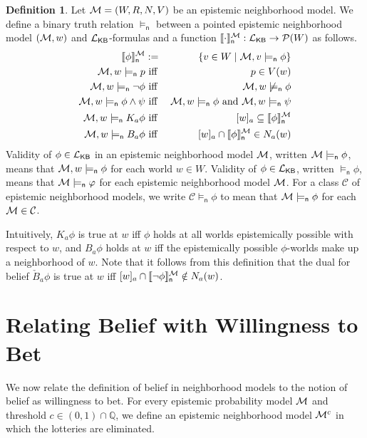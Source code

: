 \documentclass[12pt]{article}
\theoremstyle{definition}
\newtheorem{definition}[theorem]{Definition}
\newcommand{\Rat}{\mathbb{Q}}  %
\newcommand{\pow}{{\cal P}}    %
\newcommand{\M}{{\cal M}}      %
\newcommand{\Lang}{{\cal L}}   %
\newcommand{\KB}{{\mathsf{KB}}}                     %
\newcommand{\modelsn}{\models_{\mathsf{n}}}                  %
\newcommand{\semn}[1]{\llbracket{#1}\rrbracket_{\mathsf{n}}} %
\begin{document}
\begin{definition} 
  Let $\M = (W,R,N,V)$ be an epistemic neighborhood model.  We define
  a binary truth relation $\modelsn$ between a pointed epistemic
  neighborhood model $(\M,w)$ and $\Lang_\KB$-formulas and a function
  $\semn{\cdot}^\M:\Lang_\KB\to \pow(W)$ as follows.
  \begin{eqnarray*} 
    \semn{\phi}^\M & := & \{v\in W\mid \M,v\modelsn\phi\}
    \\
    \M, w \modelsn p & \text{ iff } & p \in V(w) 
    \\
    \M, w \modelsn \neg \phi & \text{ iff } & \M, w \not\modelsn \phi 
    \\
    \M, w \modelsn \phi\land\psi  & \text{ iff } 
    & \M, w \modelsn \phi \text{ and } \M, w \modelsn \psi
    \\
    \M, w \modelsn K_a \phi  & \text{ iff } & 
    [w]_a\subseteq\semn{\phi}^\M
    \\
    \M, w \modelsn B_a \phi  & \text{ iff } &
    [w]_a\cap \semn{\phi}^\M \in N_a(w)
  \end{eqnarray*}
  Validity of $\phi\in\Lang_\KB$ in an epistemic neighborhood model
  $\M$, written $\M\modelsn\phi$, means that $\M,w\modelsn\phi$ for
  each world $w\in W$.  Validity of $\phi\in\Lang_\KB$, written
  $\modelsn\phi$, means that $\M\modelsn\varphi$ for each epistemic
  neighborhood model $\M$.  For a class $\mathcal{C}$ of epistemic
  neighborhood models, we write $\mathcal{C}\modelsn\phi$ to mean that
  $\M\modelsn\phi$ for each $\M\in\mathcal{C}$.
\end{definition}

Intuitively, $K_a\phi$ is true at $w$ iff $\phi$ holds at all worlds
epistemically possible with respect to $w$, and $B_a\phi$ holds at $w$
iff the epistemically possible $\phi$-worlds make up a neighborhood of
$w$.  Note that it follows from this definition that the dual for
belief $\check{B}_a \phi$ is true at $w$ iff
$[w]_a\cap\semn{\neg\phi}^\M\notin N_a(w)$.

\section{Relating Belief with Willingness to Bet}
\label{Section:BeliefBet}

We now relate the definition of belief in neighborhood models to the
notion of belief as willingness to bet. For every epistemic
probability model $\M$ and threshold $c\in(0,1)\cap\Rat$, we define
an epistemic neighborhood model $\M^c$ in which the lotteries are
eliminated.
\end{document}
